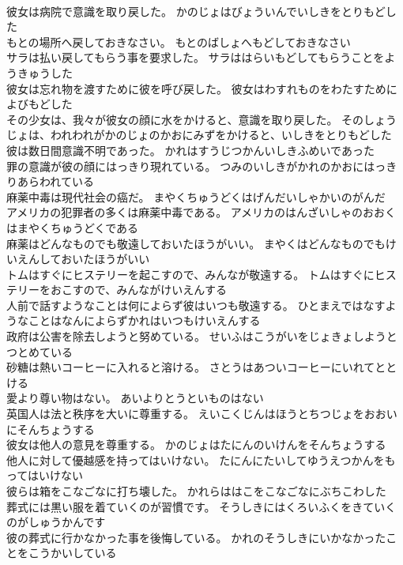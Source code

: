 \documentclass[8pt]{extreport}
\begin{document}
\begin{CJK}{UTF8}{min}
\\	彼女は病院で意識を取り戻した。	かのじょはびょういんでいしきをとりもどした 
\\	もとの場所へ戻しておきなさい。	もとのばしょへもどしておきなさい 
\\	サラは払い戻してもらう事を要求した。	サラははらいもどしてもらうことをようきゅうした 
\\	彼女は忘れ物を渡すために彼を呼び戻した。	彼女はわすれものをわたすためによびもどした 
\\	その少女は、我々が彼女の顔に水をかけると、意識を取り戻した。	そのしょうじょは、われわれがかのじょのかおにみずをかけると、いしきをとりもどした 
\\	彼は数日間意識不明であった。	かれはすうじつかんいしきふめいであった 
\\	罪の意識が彼の顔にはっきり現れている。	つみのいしきがかれのかおにはっきりあらわれている 
\\	麻薬中毒は現代社会の癌だ。	まやくちゅうどくはげんだいしゃかいのがんだ 
\\	アメリカの犯罪者の多くは麻薬中毒である。	アメリカのはんざいしゃのおおくはまやくちゅうどくである 
\\	麻薬はどんなものでも敬遠しておいたほうがいい。	まやくはどんなものでもけいえんしておいたほうがいい 
\\	トムはすぐにヒステリーを起こすので、みんなが敬遠する。	トムはすぐにヒステリーをおこすので、みんながけいえんする 
\\	人前で話すようなことは何によらず彼はいつも敬遠する。	ひとまえではなすようなことはなんによらずかれはいつもけいえんする 
\\	政府は公害を除去しようと努めている。	せいふはこうがいをじょきょしようとつとめている 
\\	砂糖は熱いコーヒーに入れると溶ける。	さとうはあついコーヒーにいれてととける 
\\	愛より尊い物はない。	あいよりとうといものはない 
\\	英国人は法と秩序を大いに尊重する。	えいこくじんはほうとちつじょをおおいにそんちょうする 
\\	彼女は他人の意見を尊重する。	かのじょはたにんのいけんをそんちょうする 
\\	他人に対して優越感を持ってはいけない。	たにんにたいしてゆうえつかんをもってはいけない 
\\	彼らは箱をこなごなに打ち壊した。	かれらははこをこなごなにぶちこわした 
\\	葬式には黒い服を着ていくのが習慣です。	そうしきにはくろいふくをきていくのがしゅうかんです 
\\	彼の葬式に行かなかった事を後悔している。	かれのそうしきにいかなかったことをこうかいしている 

\end{CJK}
\end{document}
